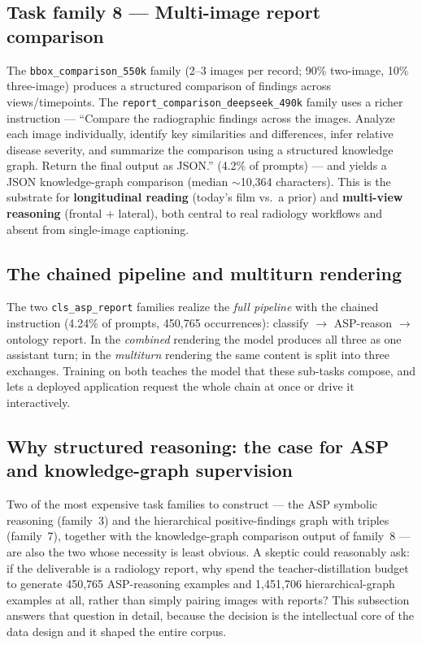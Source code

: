 \documentclass[11pt,a4paper]{article}
\begin{document}
\subsection{Task family 8 --- Multi-image report comparison}
The \texttt{bbox\_comparison\_550k} family (2--3 images per record; 90\% two-image, 10\% three-image) produces a structured comparison of findings across views/timepoints. The \texttt{report\_comparison\_deepseek\_490k} family uses a richer instruction --- ``Compare the radiographic findings across the images. Analyze each image individually, identify key similarities and differences, infer relative disease severity, and summarize the comparison using a structured knowledge graph. Return the final output as JSON.'' (4.2\% of prompts) --- and yields a JSON knowledge-graph comparison (median $\sim$10{,}364 characters). This is the substrate for \textbf{longitudinal reading} (today's film vs.\ a prior) and \textbf{multi-view reasoning} (frontal $+$ lateral), both central to real radiology workflows and absent from single-image captioning.

\subsection{The chained pipeline and multiturn rendering}
The two \texttt{cls\_asp\_report} families realize the \emph{full pipeline} with the chained instruction (4.24\% of prompts, 450{,}765 occurrences): classify $\rightarrow$ ASP-reason $\rightarrow$ ontology report. In the \emph{combined} rendering the model produces all three as one assistant turn; in the \emph{multiturn} rendering the same content is split into three exchanges. Training on both teaches the model that these sub-tasks compose, and lets a deployed application request the whole chain at once or drive it interactively.

\subsection{Why structured reasoning: the case for ASP and knowledge-graph supervision}
\label{sec:why-structured}
Two of the most expensive task families to construct --- the ASP symbolic reasoning (family~3) and the hierarchical positive-findings graph with triples (family~7), together with the knowledge-graph comparison output of family~8 --- are also the two whose necessity is least obvious. A skeptic could reasonably ask: if the deliverable is a radiology report, why spend the teacher-distillation budget to generate 450{,}765 ASP-reasoning examples and 1{,}451{,}706 hierarchical-graph examples at all, rather than simply pairing images with reports? This subsection answers that question in detail, because the decision is the intellectual core of the data design and it shaped the entire corpus.
\end{document}
